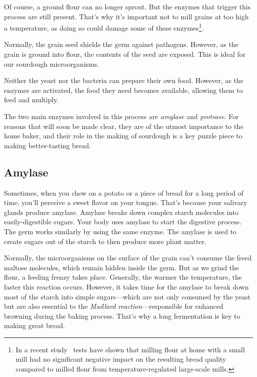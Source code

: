 Of course, a ground flour can no longer sprout. But the enzymes that
trigger this process are still present. That's why it's important not to
mill grains at too high a temperature, as doing so could damage some of
these enzymes\footnote{In a recent
study~\cite{milling+commercial+home+mill+comparison} tests have shown that
milling flour
at home with a small mill had no significant negative impact on the resulting
bread quality compared to milled flour from temperature-regulated large-scale
mills.}.

Normally, the grain seed shields the germ against pathogens. However, as the
grain is ground into flour, the contents of the seed are exposed. This is ideal
for our sourdough microorganisms.

Neither the yeast nor the bacteria can prepare their own food. However, as
the enzymes are activated, the food they need becomes available, allowing them
to feed and multiply.

The two main enzymes involved in this process are \emph{amylase} and
\emph{protease}. For reasons that will soon be made clear, they are of the
utmost importance to the home baker, and their role in the making of sourdough
is a key puzzle piece to making better-tasting bread.

\subsection{Amylase}

Sometimes, when you chew on a potato or a piece of bread for a long period
of time, you'll perceive a sweet flavor on your tongue. That's because your
salivary glands produce amylase. Amylase breaks down complex starch molecules
into easily-digestible sugars. Your body uses amylase to start the digestive
process. The germ works similarly by using the same enzyme. The amylase
is used to create sugars out of the starch to then produce more plant matter.

Normally,
the microorganisms on the surface of the grain can't consume the freed maltose
molecules, which remain hidden inside the germ. But as we grind the flour, a
feeding frenzy takes place.  Generally, the warmer the temperature, the faster
this reaction occurs. However, it takes time for the amylase
to break down most of the starch into simple sugars---which are not only
consumed by the yeast but are also
essential to the \emph{Maillard reaction}---responsible for
enhanced browning during the baking process.
That's why a long fermentation is key to making great bread.

